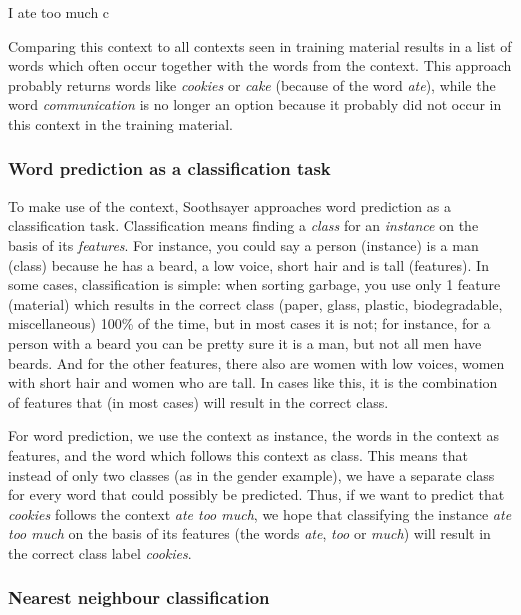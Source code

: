 \documentclass[11pt]{article}
\begin{document}
\begin{examples}
\item I ate too much c \label{only_c_r}
\end{examples}

Comparing this context to all contexts seen in training material results in a list of words which often occur together with the words from the context. This approach probably returns words like \emph{cookies} or \emph{cake} (because of the word \emph{ate}), while the word \emph{communication} is no longer an option because it probably did not occur in this context in the training material.

\subsubsection{Word prediction as a classification task}

To make use of the context, Soothsayer approaches word prediction as a classification task. Classification means finding a \emph{class} for an \emph{instance} on the basis of its \emph{features}. For instance, you could say a person (instance) is a man (class) because he has a beard, a low voice, short hair and is tall (features). In some cases, classification is simple: when sorting garbage, you use only 1 feature (material) which results in the correct class (paper, glass, plastic, biodegradable, miscellaneous) 100\% of the time, but in most cases it is not; for instance, for a person with a beard you can be pretty sure it is a man, but not all men have beards. And for the other features, there also are women with low voices, women with short hair and women who are tall. In cases like this, it is the combination of features that (in most cases) will result in the correct class.

For word prediction, we use the context as instance, the words in the context as features, and the word which follows this context as class. This means that instead of only two classes (as in the gender example), we have a separate class for every word that could possibly be predicted. Thus, if we want to predict that \emph{cookies} follows the context \emph{ate too much}, we hope that classifying the instance \emph{ate too much} on the basis of its features (the words \emph{ate}, \emph{too} or \emph{much}) will result in the correct class label \emph{cookies}.

\subsubsection{Nearest neighbour classification}
\end{document}

